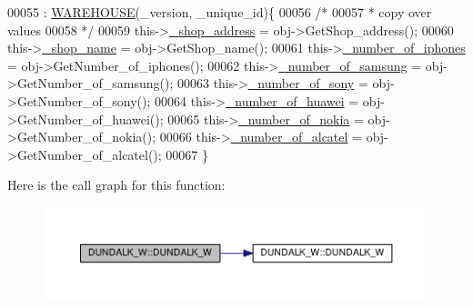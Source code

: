 \begin{DoxyCode}
00055                                                                          : 
      \hyperlink{class_w_a_r_e_h_o_u_s_e_a7a924d389af91f54ed0e1d1d8d56ec57_a7a924d389af91f54ed0e1d1d8d56ec57}{WAREHOUSE}(\_version, \_unique\_id)\{
00056         \textcolor{comment}{/*}
00057 \textcolor{comment}{         * copy over values
}
00058 \textcolor{comment}{         */}
00059         this->\hyperlink{class_d_u_n_d_a_l_k___w_a84ef96f22ec520afc66bb26b0d264475_a84ef96f22ec520afc66bb26b0d264475}{\_shop\_address} = obj->GetShop\_address();
00060         this->\hyperlink{class_d_u_n_d_a_l_k___w_ac9018980d31ba581cd83b07df0b171e2_ac9018980d31ba581cd83b07df0b171e2}{\_shop\_name} = obj->GetShop\_name();
00061         this->\hyperlink{class_d_u_n_d_a_l_k___w_a82b528f661644166d93a5209524b4543_a82b528f661644166d93a5209524b4543}{\_number\_of\_iphones} = obj->GetNumber\_of\_iphones();
00062         this->\hyperlink{class_d_u_n_d_a_l_k___w_afec98ddc022c03aaaaa2848e5ca7cfb3_afec98ddc022c03aaaaa2848e5ca7cfb3}{\_number\_of\_samsung} = obj->GetNumber\_of\_samsung();
00063         this->\hyperlink{class_d_u_n_d_a_l_k___w_a9a40b513a6d4153a9a0f37ce47429369_a9a40b513a6d4153a9a0f37ce47429369}{\_number\_of\_sony} = obj->GetNumber\_of\_sony();
00064         this->\hyperlink{class_d_u_n_d_a_l_k___w_a84781068676dee44cb4654706d8fec51_a84781068676dee44cb4654706d8fec51}{\_number\_of\_huawei} = obj->GetNumber\_of\_huawei();
00065         this->\hyperlink{class_d_u_n_d_a_l_k___w_a8e794ecf0c55b5606a8f4a0ab214c657_a8e794ecf0c55b5606a8f4a0ab214c657}{\_number\_of\_nokia} = obj->GetNumber\_of\_nokia();
00066         this->\hyperlink{class_d_u_n_d_a_l_k___w_a67a471ec2d409a309ebc179ff4d789bc_a67a471ec2d409a309ebc179ff4d789bc}{\_number\_of\_alcatel} = obj->GetNumber\_of\_alcatel();
00067     \}
\end{DoxyCode}


Here is the call graph for this function\+:\nopagebreak
\begin{figure}[H]
\begin{center}
\leavevmode
\includegraphics[width=350pt]{class_d_u_n_d_a_l_k___w_a12eb6e2b3a96d00049f55a693c63e64d_a12eb6e2b3a96d00049f55a693c63e64d_cgraph}
\end{center}
\end{figure}


